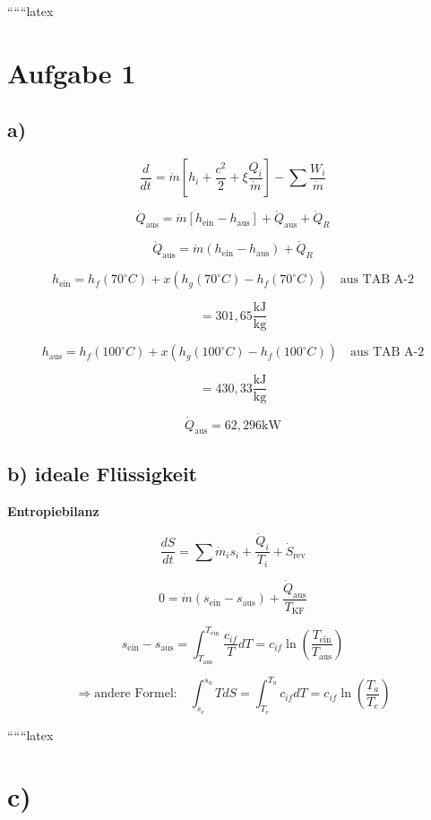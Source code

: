 
``````latex


\section*{Aufgabe 1}

\subsection*{a)}

\[
\frac{d}{dt} = \dot{m} \left[ h_i + \frac{c^2}{2} + \xi \frac{Q_i}{\dot{m}} \right] - \sum \frac{W_i}{\dot{m}}
\]

\[
\dot{Q}_{\text{aus}} = \dot{m} \left[ h_{\text{ein}} - h_{\text{aus}} \right] + \dot{Q}_{\text{aus}} + \dot{Q}_R
\]

\[
\dot{Q}_{\text{aus}} = \dot{m} (h_{\text{ein}} - h_{\text{aus}}) + \dot{Q}_R
\]

\[
h_{\text{ein}} = h_f(70^\circ C) + x \left( h_g(70^\circ C) - h_f(70^\circ C) \right) \quad \text{aus TAB A-2}
\]

\[
= 301,65 \frac{\text{kJ}}{\text{kg}}
\]

\[
h_{\text{aus}} = h_f(100^\circ C) + x \left( h_g(100^\circ C) - h_f(100^\circ C) \right) \quad \text{aus TAB A-2}
\]

\[
= 430,33 \frac{\text{kJ}}{\text{kg}}
\]

\[
\dot{Q}_{\text{aus}} = 62,296 \text{kW}
\]

\subsection*{b) ideale Flüssigkeit}

\textbf{Entropiebilanz}

\[
\frac{dS}{dt} = \sum \dot{m}_i s_i + \frac{\dot{Q}_i}{T_i} + \dot{S}_{\text{rev}}
\]

\[
0 = \dot{m} (s_{\text{ein}} - s_{\text{aus}}) + \frac{\dot{Q}_{\text{aus}}}{T_{\text{KF}}}
\]

\[
s_{\text{ein}} - s_{\text{aus}} = \int_{T_{\text{aus}}}^{T_{\text{ein}}} \frac{c_{if}}{T} dT = c_{if} \ln \left( \frac{T_{\text{ein}}}{T_{\text{aus}}} \right)
\]

\[
\Rightarrow \text{andere Formel:} \quad \int_{s_e}^{s_a} T dS = \int_{T_e}^{T_a} c_{if} dT = c_{if} \ln \left( \frac{T_a}{T_e} \right)
\]

``````latex


\section*{c)}

